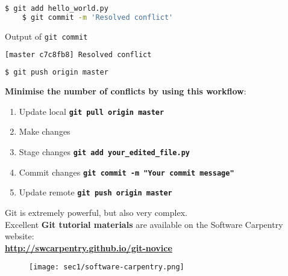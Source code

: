 \begin{frame}[fragile]
\emptyframetitle

  \begin{lstlisting}[language=bash]
    $ git add hello_world.py 
    $ git commit -m 'Resolved conflict'
  \end{lstlisting}

  \vspace*{-0.25cm}
  \begin{block}{Output of \texttt{git commit}}
  \vspace*{-0.25cm}
    \begin{lstlisting}[language=bash]
      [master c7c8fb8] Resolved conflict
    \end{lstlisting}
  \end{block}
 
  \vspace*{-0.25cm}
  \begin{lstlisting}[language=bash]
    $ git push origin master 
  \end{lstlisting}

  \vspace*{0.25cm}

  \textbf{Minimise the number of conflicts by using this workflow}:

  \begin{enumerate}
    \item Update local \hspace*{0.25cm} \texttt{\textbf{git pull origin master}}
    \item Make changes	
    \item Stage changes \hspace*{0.25cm} \texttt{\textbf{git add your\_edited\_file.py}}
    \item Commit changes \hspace*{0.25cm} \texttt{\textbf{git commit -m "Your commit message"}}
    \item Update remote \hspace*{0.25cm} \texttt{\textbf{git push origin master}}
  \end{enumerate}

\end{frame}

\begin{frame}[fragile]
\emptyframetitle

  Git is extremely powerful, but also very complex.\\[0.5cm]

  Excellent \textbf{Git tutorial materials} are available on the Software Carpentry website:\\[0.5cm]
  \textbf{\url{http://swcarpentry.github.io/git-novice}}\\[0.5cm]

  \begin{figure}[h]
    \texttt{[image: sec1/software-carpentry.png]}
  \end{figure}


\end{frame}

